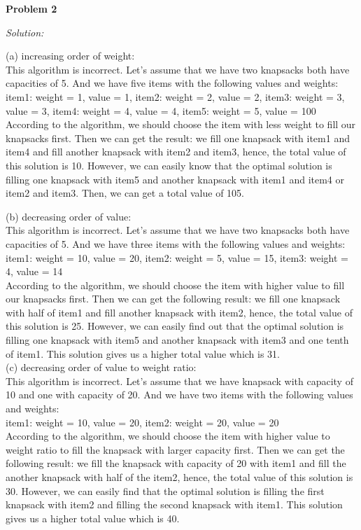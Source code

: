 \documentclass[12pt,letterpaper]{article}
\def\pp{\par\noindent}
\newcommand{\problem}[1]{ \bigskip \pp \textbf{Problem #1}\par}
\newcommand{\solution}{\textit{Solution:}\par}
\begin{document}
\problem{2}
\solution
(a) increasing order of weight: \\
This algorithm is incorrect. Let's assume that we have two knapsacks both have capacities of 5. And we have five items with the following values and weights: \\
item1: weight = 1, value = 1, item2: weight = 2, value = 2, item3: weight = 3, value = 3, item4: weight = 4, value = 4, item5: weight = 5, value = 100 \\
According to the algorithm, we should choose the item with less weight to fill our knapsacks first. Then we can get the result: we fill one knapsack with item1 and item4 and fill another knapsack with item2 and item3, hence, the total value of this solution is 10. However, we can easily know that the optimal solution is filling one knapsack with item5 and another knapsack with item1 and item4 or item2 and item3. Then, we can get a total value of 105. 

(b) decreasing order of value: \\
This algorithm is incorrect. Let's assume that we have two knapsacks both have capacities of 5. And we have three items with the following values and weights: \\
item1: weight = 10, value = 20, item2: weight = 5, value = 15, item3: weight = 4, value = 14 \\
According to the algorithm, we should choose the item with higher value to fill our knapsacks first. Then we can get the following result: we fill one knapsack with half of item1 and fill another knapsack with item2, hence, the total value of this solution is 25. However, we can easily find out that the optimal solution is filling one knapsack with item5 and another knapsack with item3 and one tenth of item1. This solution gives us a higher total value which is 31. \\

(c) decreasing order of value to weight ratio: \\
This algorithm is incorrect. Let's assume that we have knapsack with capacity of 10 and one with capacity of 20. And we have two items with the following values and weights: \\
item1: weight = 10, value = 20, item2: weight = 20, value = 20 \\
According to the algorithm, we should choose the item with higher value to weight ratio to fill the knapsack with larger capacity first. Then we can get the following result: we fill the knapsack with capacity of 20 with item1 and fill the another knapsack with half of the item2, hence, the total value of this solution is 30. However, we can easily find that the optimal solution is filling the first knapsack with item2 and filling the second knapsack with item1. This solution gives us a higher total value which is 40. \\
\end{document}
